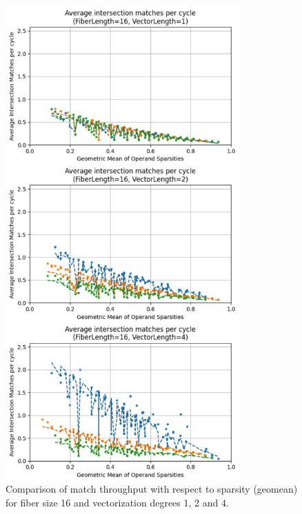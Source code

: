 \begin{figure}[H]
    \centering
    \includegraphics[width=0.8\textwidth]{figures/isect_model_fl16_vl1.pdf}
    \caption{Comparison of match throughput with respect to sparsity (geomean) for fiber size 16 and vectorization degrees 1, 2 and 4.}
    \label{fig:isect_model_fl16_vl1}
\end{figure}

\clearpage

